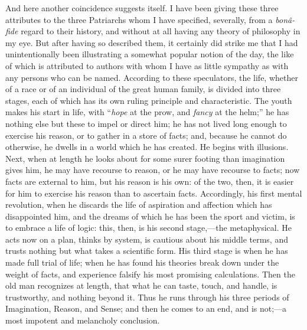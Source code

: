 And here another coincidence suggests itself. I have been giving
these three attributes to the three Patriarchs whom I have specified,
severally, from a \emph{bonâ-fide} regard to their history, and
without at all having any theory of philosophy in my eye. But after
having so described them, it certainly did strike me that I had
unintentionally been illustrating a somewhat popular notion of the
day, the like of which is attributed to authors with whom I have as
little sympathy as with any persons who can be named. According to
these speculators, the life, whether of a race or of an individual of
the great human family, is divided into three stages, each of which
has its own ruling principle and characteristic. The youth makes his
start in life, with ``\emph{hope} at the prow, and \emph{fancy} at
the helm;'' he has nothing else but these to impel or direct him;
he has not lived long enough to exercise his reason, or to gather in a
store of facts; and, because he cannot do otherwise, he dwells in a
world which he has created. He begins with illusions. Next, when at
length he looks about for some surer footing than imagination gives
him, he may have recourse to reason, or he may have recourse to facts;
now facts are external to him, but his reason is his own: of the two,
then, it is easier for him to exercise his reason than to ascertain
facts. Accordingly, his first mental revolution, when he discards the
life of aspiration and affection which has disappointed him, and the
dreams of which he has been the sport and victim, is to embrace a life
of logic: this, then, is his second stage,—the metaphysical.
He acts now on a plan, thinks by system, is cautious about his middle
terms, and trusts nothing but what takes a scientific form. His third
stage is when he has made full trial of life; when he has found his
theories break down under the weight of facts, and experience falsify
his most promising calculations. Then the old man recognizes at
length, that what he can taste, touch, and handle, is trustworthy, and
nothing beyond it. Thus he runs through his three periods of
Imagination, Reason, and Sense; and then he comes to an end, and is
not;—a most impotent and melancholy conclusion.


